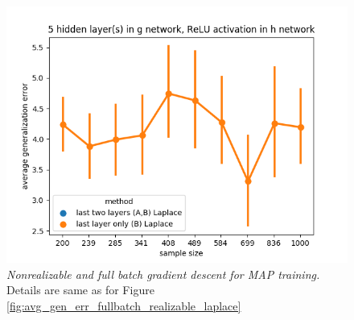 \documentclass{article} %
\begin{document}
\begin{figure}[t!]
\begin{center}
		\includegraphics[scale=0.35]{laplace_taskid3.png}
	\end{center}
	\caption{\textit{Nonrealizable and full batch gradient descent for MAP training.} Details are same as for Figure \ref{fig:avg_gen_err_fullbatch_realizable_laplace}
	}
	\label{fig:avg_gen_err_fullbatch_nonrealizable_laplace}
\end{figure}
\end{document}
